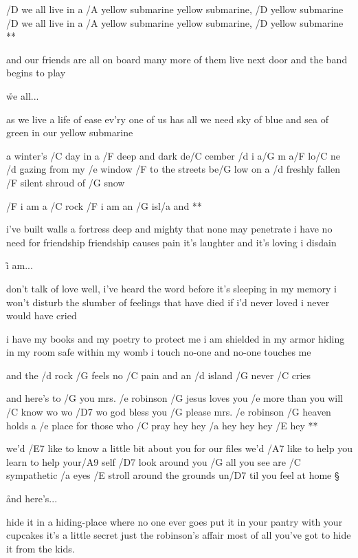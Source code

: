 \R  /D we all live in a /A yellow submarine
    yellow submarine, /D yellow submarine
    /D we all live in a /A yellow submarine
    yellow submarine, /D yellow submarine **

and our friends are all on board
many more of them live next door
and the band begins to play

\r we all...

as we live a life of ease
ev'ry one of us has all we need
sky of blue and sea of green
in our yellow submarine

\rr




a winter's /C day
in a /F deep and dark de/C cember
/d i a/G m a/F lo/C ne
/d gazing from my /e window
/F to the streets be/G low
on a /d freshly fallen /F silent shroud of /G snow

\R /F i am a /C rock
   /F i am an /G isl/a and **

i've built walls
a fortress deep and mighty
that none may penetrate
i have no need for friendship
friendship causes pain
it's laughter and it's loving i disdain

\r i am...

don't talk of love
well, i've heard the word before
it's sleeping in my memory
i won't disturb the slumber
of feelings that have died
if i'd never loved
i never would have cried

\rr

i have my books
and my poetry to protect me
i am shielded in my armor
hiding in my room
safe within my womb
i touch no-one and no-one touches me

\rr

and the /d rock /G feels no /C pain
and an /d island /G never /C cries




\R	and here's to /G you mrs. /e robinson
	/G jesus loves you /e more than you will /C know wo wo /D7 wo
	god bless you /G please mrs. /e robinson
	/G heaven holds a /e place for those who /C pray
	hey hey /a hey hey hey /E hey **

we'd /E7 like to know a little bit about you for our files
we'd /A7 like to help you learn to help your/A9 self
/D7 look around you /G all you see are /C sympathetic /a eyes
/E stroll around the grounds un/D7 til you feel at home \S

\r and here's...

hide it in a hiding-place where no one ever goes
put it in your pantry with your cupcakes
it's a little secret just the robinson's affair
most of all you've got to hide it from the kids.

